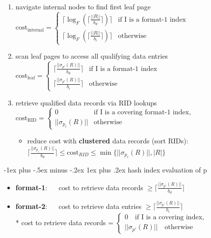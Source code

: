 \documentclass[10pt, landscape]{article}
\makeatletter
\renewcommand{\subsubsection}{\@startsection{subsubsection}{3}{0mm}%
  {-1ex plus -.5ex minus -.2ex}%
  {1ex plus .2ex}%
{\normalfont\small\bfseries}}%
\makeatother
\begin{document}
\begin{multicols*}{4}
  \begin{enumerate}
    \item navigate internal nodes to find first leaf page
      \( {\displaystyle{ 
          \text{cost}_{\text{internal}}=
          \begin{cases}
            \lceil \log_F ( \lceil \frac{||R||}{b_d} \rceil )\rceil &\text{if $$I$$ is a format-1 index}\\
            \lceil \log_F ( \lceil 
            \frac{||R||}{b_i} \rceil )\rceil  &\text{otherwise}
          \end{cases}
      }} \) 
    \item scan leaf pages to access all qualifying data entries
      \( {\displaystyle{ 
          \text{cost}_{\text{leaf}}=
          \begin{cases}
            \lceil \frac{||\sigma_{p'}(R)||}{b_d} \rceil &\text{if $$I$$ is a format-1 index}\\
            \lceil \frac{||\sigma_{p'}(R)||}{b_i} \rceil &\text{otherwise}
          \end{cases}
      }} \) 
    \item retrieve qualified data records via RID lookups
      \( {\displaystyle{ 
          \text{cost}_{\text{RID}}=
          \begin{cases}
            0 &\text{if $$I$$ is a covering format-1 index,}\\
            ||\sigma_{p_c}(R)||  &\text{otherwise}
          \end{cases}
      }} \) 
      \begin{itemize}
        \item reduce cost with \textbf{clustered} data records (sort RIDs): 
          $\lceil\frac{||\sigma_{p_c}(R)||}{b_d}\rceil \leq \text{cost}_{RID} \leq \min\{||\sigma_{p_c}(R)||, |R|\}$
      \end{itemize}
  \end{enumerate}

  \subsubsection{hash index evaluation of p}

  \begin{itemize}
    \item \textbf{format-1}: $\quad$ cost to retrieve data records $ \geq \lceil\frac{||\sigma_{p'}(R)||}{b_d}\rceil $
    \item \textbf{format-2}: $\quad$ cost to retrieve data entries $ \geq \lceil\frac{||\sigma_{p'}(R)||}{b_i}\rceil $ 
      \\* cost to retrieve data records = $ \begin{cases} 0 \quad \text{if $$I$$ is a covering index,}\\
        ||\sigma_{p'}(R)||  \quad \text{otherwise}
      \end{cases} $
  \end{itemize}



\end{multicols*}
\end{document}
